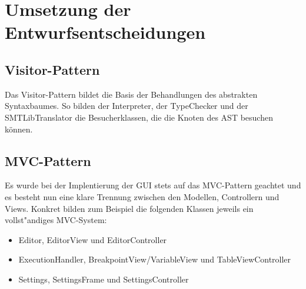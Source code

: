 \section{Umsetzung der Entwurfsentscheidungen}
\subsection{Visitor-Pattern}
Das Visitor-Pattern bildet die Basis der Behandlungen des abstrakten Syntaxbaumes. So bilden der Interpreter, der TypeChecker und der SMTLibTranslator die Besucherklassen, die die Knoten des AST besuchen k\"{o}nnen.
\subsection{MVC-Pattern}
Es wurde bei der Implentierung der GUI stets auf das MVC-Pattern geachtet und es besteht nun eine klare Trennung zwischen den Modellen, Controllern und Views. Konkret bilden zum Beispiel die folgenden Klassen jeweils ein vollst"andiges MVC-System: 
\begin{itemize}
\item Editor, EditorView und EditorController
\item ExecutionHandler, BreakpointView/VariableView und TableViewController
\item Settings, SettingsFrame und SettingsController
\end{itemize}